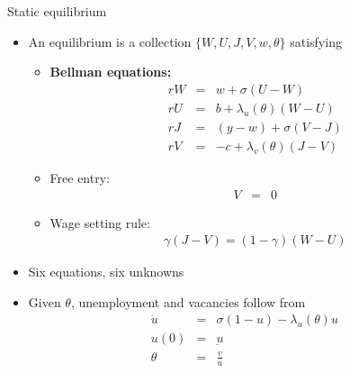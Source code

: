 \documentclass[9pt]{beamer}
\newcommand{\bit}{\begin{itemize}}
\newcommand{\eit}{\end{itemize}}
\begin{document}
\begin{frame}{Static equilibrium}

\bit
\setlength\itemsep{1.5em}

\item An equilibrium is a collection $\{W,U, J, V, w, \theta\}$ satisfying
\bit
	\item \bf Bellman equations:
		\begin{eqnarray}
		rW &=& w  + \sigma \left(U-W \right) \nonumber \\ 
		rU &=& b  + \lambda_u(\theta) \left(W-U\right) \nonumber \\
		rJ &=& (y-w)  + \sigma \left(V-J\right) \nonumber \\ 
		rV &=& -c  + \lambda_v(\theta) \left(J-V\right) \nonumber
		\end{eqnarray}

	\item Free entry:
		\begin{eqnarray}
		V &=& 0 \nonumber 
		\end{eqnarray}

	\item Wage setting rule: \normalfont
	\begin{eqnarray}
	\gamma (J-V) = (1-\gamma) (W-U) \nonumber
	\end{eqnarray}
\eit

\item Six equations, six unknowns

\item Given $\theta$, unemployment and vacancies follow from
\begin{eqnarray}
	\dot{u} &=& \sigma (1-u) - \lambda_u(\theta)u \nonumber \\
u(0) &=& \underbar{u} \nonumber \\
\theta &=& \frac{v}{u} \nonumber
\end{eqnarray}
\eit
\end{frame}
\end{document}
